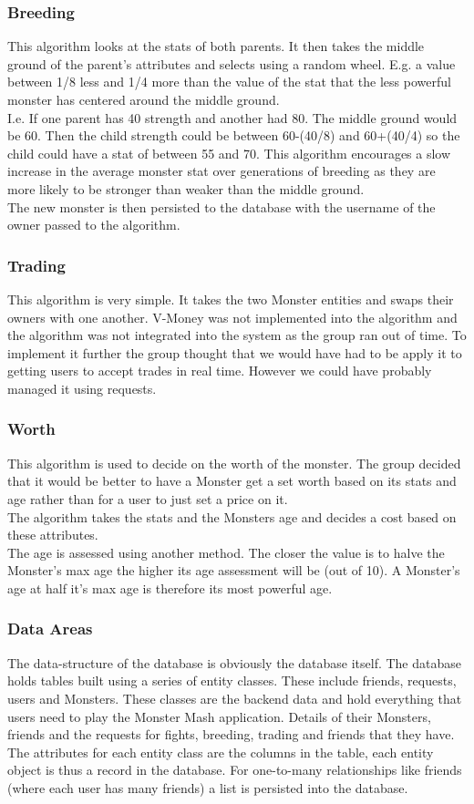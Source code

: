 \documentclass[titlepage]{article}
\begin{document}
{\subsubsection {Breeding}
This algorithm looks at the stats of both parents. It then takes the middle ground of the parent's attributes and selects using a random wheel. E.g. a value between 1/8 less and 1/4 more than the value of the stat that the less powerful monster has centered around the middle ground.
\\
I.e. If one parent has 40 strength and another had 80. The middle ground would be 60. Then the child strength could be between 60-(40/8) and 60+(40/4) so the child could have a stat of between 55 and 70. This algorithm encourages a slow increase in the average monster stat over generations of breeding as they are more likely to be stronger than weaker than the middle ground.
\\
The new monster is then persisted to the database with the username of the owner passed to the algorithm.
\subsubsection{Trading}
This algorithm is very simple. It takes the two Monster entities and swaps their owners with one another. V-Money was not implemented into the algorithm and the algorithm was not integrated into the system as the group ran out of time. To implement it further the group thought that we would have had to be apply it to getting users to accept trades in real time. However we could have probably managed it using requests.
\subsubsection{Worth}
This algorithm is used to decide on the worth of the monster. The group decided that it would be better to have a Monster get a set worth based on its stats and age rather than for a user to just set a price on it.
\\
The algorithm takes the stats and the Monsters age and decides a cost based on these attributes.
\\
The age is assessed using another method. The closer the value is to halve the Monster's max age the higher its age assessment will be (out of 10). A Monster's age at half it’s max age is therefore its most powerful age.
\subsubsection{Data Areas}
The data-structure of the database is obviously the database itself. The database holds tables built using a series of entity classes. These include friends, requests, users and Monsters. These classes are the backend data and hold everything that users need to play the Monster Mash application. Details of their Monsters, friends and the requests for fights, breeding, trading and friends that they have.
\\
The attributes for each entity class are the columns in the table, each entity object is thus a record in the database. For one-to-many relationships like friends (where each user has many friends) a list is persisted into the database.
}
\end{document}
